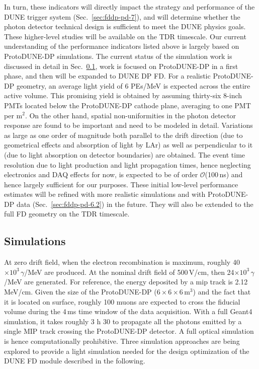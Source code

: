 In turn, these indicators will directly impact the strategy and performance of the DUNE trigger system (Sec.~\ref{sec:fddp-pd-7}), and will determine whether the photon detector technical design is sufficient to meet the DUNE physics goals. These higher-level studies will be available on the TDR timescale.  Our current understanding of the performance indicators listed above is largely based on ProtoDUNE-DP simulations. The current status of the simulation work is discussed in detail in Sec.~\ref{sec:fddp-pd-6.1}, work is focused on ProtoDUNE-DP in a first phase, and then will be expanded to DUNE DP FD. For a realistic ProtoDUNE-DP geometry, an average light yield of 6 PEs/MeV is expected across the entire active volume. This promising yield is obtained  by assuming thirty-six 8-inch PMTs located below the ProtoDUNE-DP cathode plane, averaging to one PMT per m$^2$. On the other hand, spatial non-uniformities in the photon detector response are found to be important and need to be modeled in detail. Variations as large as one order of magnitude both parallel to the drift direction (due to geometrical effects and absorption of light by LAr) as well as perpendicular to it (due to light absorption on detector boundaries) are obtained. The event time resolution due to light production and light propagation times, hence neglecting electronics and DAQ effects for now, is expected to be of order $\mathcal{O}$(100\,ns) and hence largely sufficient for our purposes. These initial low-level performance estimates will be refined with more realistic simulations and with ProtoDUNE-DP data (Sec.~\ref{sec:fddp-pd-6.2}) in the future. They will also be extended to the full FD geometry on the TDR timescale.

\subsection{Simulations}
\label{sec:fddp-pd-6.1}

At zero drift field, when the electron recombination is maximum, roughly 40$\times10^3\,\gamma$/MeV are produced. At the nominal drift field of 500\,V/cm, then 24$\times10^3\,\gamma$/MeV are generated. For reference, the energy deposited by a mip track is 2.12\,MeV/cm. Given the size of the ProtoDUNE-DP ($6\times6\times6$\,m$^3$) and the fact that it is located on surface, roughly 100 muons are expected to cross the fiducial volume during the 4\,ms time window of the data acquisition. With a full Geant4 \cite{geant4} simulation, it takes roughly 3 h 30 to propagate all the photons emitted by a single MIP track crossing the ProtoDUNE-DP detector. A full optical simulation is hence computationally prohibitive. Three simulation approaches are being explored to provide a light simulation needed for the design optimization of the DUNE FD module described in the following.


